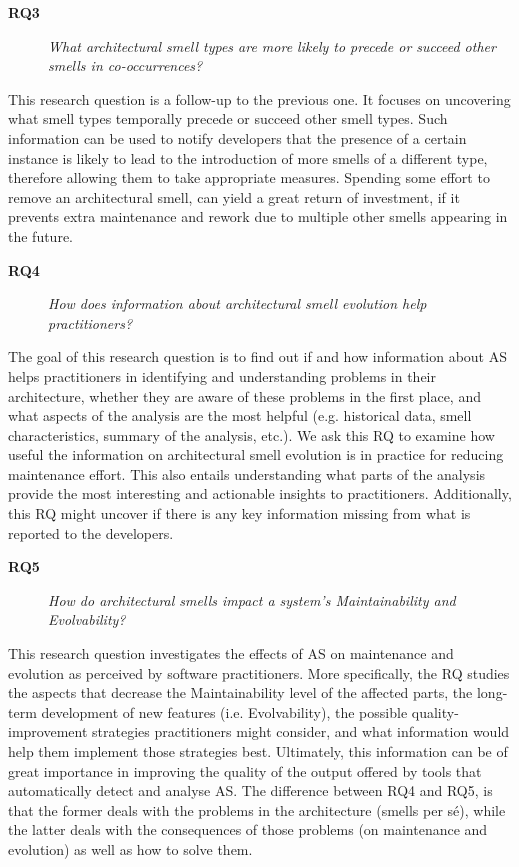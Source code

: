 \begin{description}
    \item[\textbf{RQ3}] \textit{What architectural smell types are more likely to precede or succeed other smells in co-occurrences?}
\end{description}
This research question is a follow-up to the previous one. It focuses on uncovering what smell types temporally precede or succeed other smell types.
Such information can be used to notify developers that the presence of a certain instance is likely to lead to the introduction of more smells of a different type, therefore allowing them to take appropriate measures. Spending some effort to remove an architectural smell, can yield a great return of investment, if it prevents extra maintenance and rework due to multiple other smells appearing in the future.


\begin{description}
    \item[\textbf{RQ4}] \textit{How does information about architectural smell evolution help practitioners?} %
\end{description}
The goal of this research question is to find out if and how information about AS helps practitioners in identifying and understanding problems in their architecture, whether they are aware of these problems in the first place, and what aspects of the analysis are the most helpful (e.g. historical data, smell characteristics, summary of the analysis, etc.).
We ask this RQ to examine how useful the information on architectural smell evolution is in practice for reducing maintenance effort. 
This also entails understanding what parts of the analysis provide the most interesting and actionable insights to practitioners.
Additionally, this RQ might uncover if there is any key information missing from what is reported to the developers.

\begin{description}
    \item[\textbf{RQ5}] \textit{How do architectural smells impact a system's Maintainability and Evolvability?}
\end{description}
This research question investigates the effects of AS on maintenance and evolution as perceived by software practitioners.
More specifically, the RQ studies the aspects that decrease the Maintainability level of the affected parts, the long-term development of new features (i.e. Evolvability), the possible quality-improvement strategies practitioners might consider, and what information would help them implement those strategies best.
Ultimately, this information can be of great importance in improving the quality of the output offered by tools that automatically detect and analyse AS. The difference between RQ4 and RQ5, is that the former deals with the problems in the architecture (smells per sé), while the latter deals with the consequences of those problems (on maintenance and evolution) as well as how to solve them.

